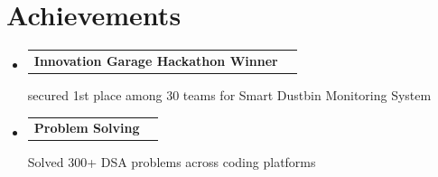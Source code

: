 \documentclass[a4paper,11pt]{article}
\makeatletter
\newcommand{\resumePOR}[3]{
\vspace{0.5mm}\item
    \begin{tabular*}{0.97\textwidth}[t]{l@{\extracolsep{\fill}}r}
        \textbf{#1}\hspace{0.3mm}#2 & \textit{\small{#3}} 
    \end{tabular*}
    \vspace{-2mm}
}
\newcommand{\resumeSubHeadingListStart}{\begin{itemize}[leftmargin=*,labelsep=0mm]}
\newcommand{\resumeSubHeadingListEnd}{\end{itemize}\vspace{2mm}}
\makeatother
\begin{document}
\section{\textbf{Achievements}}
\vspace{-0.4mm}
\resumeSubHeadingListStart
\resumePOR{Innovation Garage Hackathon Winner}{}{} %
    {secured 1st place among 30 teams for Smart Dustbin Monitoring System} %
    {} %
\resumePOR{Problem Solving }{}{} %
    {Solved 300+ DSA problems across coding platforms} %
    
\resumeSubHeadingListEnd
\vspace{-5mm}

\end{document}
